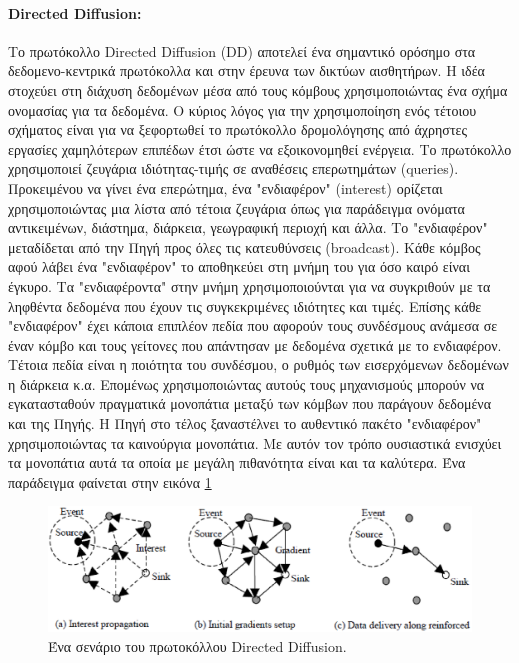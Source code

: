 \paragraph{Directed Diffusion:}  Το πρωτόκολλο Directed Diffusion (DD) \cite{directed_diffusion} αποτελεί ένα σημαντικό ορόσημο στα δεδομενο-κεντρικά πρωτόκολλα και
στην έρευνα των δικτύων αισθητήρων. Η ιδέα στοχεύει στη διάχυση δεδομένων μέσα από τους κόμβους χρησιμοποιώντας ένα σχήμα ονομασίας για τα δεδομένα. Ο κύριος λόγος
για την χρησιμοποίηση ενός τέτοιου σχήματος είναι για να ξεφορτωθεί το πρωτόκολλο δρομολόγησης από άχρηστες εργασίες χαμηλότερων επιπέδων έτσι ώστε να εξοικονομηθεί
ενέργεια. Το πρωτόκολλο χρησιμοποιεί ζευγάρια ιδιότητας-τιμής σε αναθέσεις επερωτημάτων (queries). Προκειμένου να γίνει ένα επερώτημα, ένα "ενδιαφέρον" (interest)
ορίζεται χρησιμοποιώντας μια λίστα από τέτοια ζευγάρια όπως για παράδειγμα ονόματα αντικειμένων, διάστημα, διάρκεια, γεωγραφική περιοχή και άλλα. Το "ενδιαφέρον"
μεταδίδεται από την Πηγή προς όλες τις κατευθύνσεις (broadcast). Κάθε κόμβος αφού λάβει ένα "ενδιαφέρον" το αποθηκεύει στη μνήμη του για όσο καιρό είναι έγκυρο. Τα
"ενδιαφέροντα" στην μνήμη χρησιμοποιούνται για να συγκριθούν με τα ληφθέντα δεδομένα που έχουν τις συγκεκριμένες ιδιότητες και τιμές. Επίσης κάθε "ενδιαφέρον" έχει
κάποια επιπλέον πεδία που αφορούν τους συνδέσμους ανάμεσα σε έναν κόμβο και τους γείτονες που απάντησαν με δεδομένα σχετικά με το ενδιαφέρον. Τέτοια πεδία είναι η
ποιότητα του συνδέσμου, ο ρυθμός των εισερχόμενων δεδομένων η διάρκεια κ.α. Επομένως χρησιμοποιώντας αυτούς τους μηχανισμούς μπορούν να εγκατασταθούν πραγματικά
μονοπάτια μεταξύ των κόμβων που παράγουν δεδομένα και της Πηγής. Η Πηγή στο τέλος ξαναστέλνει το αυθεντικό πακέτο "ενδιαφέρον" χρησιμοποιώντας τα καινούργια
μονοπάτια. Με αυτόν τον τρόπο ουσιαστικά ενισχύει τα μονοπάτια αυτά τα οποία με μεγάλη πιθανότητα είναι και τα καλύτερα. Ένα παράδειγμα φαίνεται στην εικόνα
\ref{fig:dd_example}

\begin{figure}[h]
	\centering
	\includegraphics[width=\textwidth]{images/directed_diffusion.eps}
	\caption{Ένα σενάριο του πρωτοκόλλου Directed Diffusion.}
	\label{fig:dd_example}
\end{figure}


